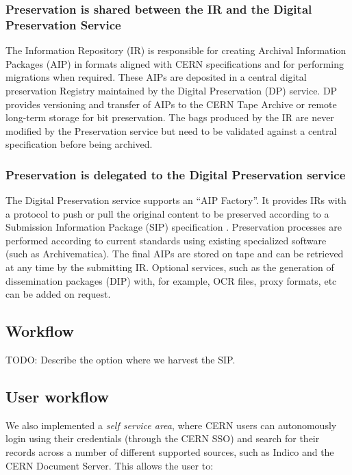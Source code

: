 \documentclass[11pt]{IEEEtran}
\begin{document}
\subsubsection{Preservation is shared between the IR and the Digital Preservation Service}

The Information Repository (IR) is responsible for creating Archival Information Packages (AIP) in formats aligned with CERN specifications and for performing migrations when required. These AIPs are deposited in a central digital preservation Registry maintained by the Digital Preservation (DP) service. DP provides versioning and transfer of AIPs to the CERN Tape Archive or remote long-term storage for bit preservation. The bags produced by the IR are never modified by the Preservation service but need to be validated against a central specification before being archived.

\subsubsection{Preservation is delegated to the Digital Preservation service}

The Digital Preservation service supports an “AIP Factory”. It provides IRs with a protocol to push or pull the original content to be preserved according to a Submission Information Package (SIP) specification . Preservation processes are performed according to current standards using existing specialized software (such as Archivematica). The final AIPs are stored on tape and can be retrieved at any time by the submitting IR. Optional services, such as the generation of dissemination packages (DIP) with, for example, OCR files, proxy formats, etc can be added on request.


\subsection{Workflow}

TODO: Describe the option where we harvest the SIP.

\subsection{User workflow}

We also implemented a \textit{self service area}, where CERN users can autonomously login using their credentials (through the CERN SSO) and search for their records across a number of different supported sources, such as Indico and the CERN Document Server. This allows the user to:
\end{document}
